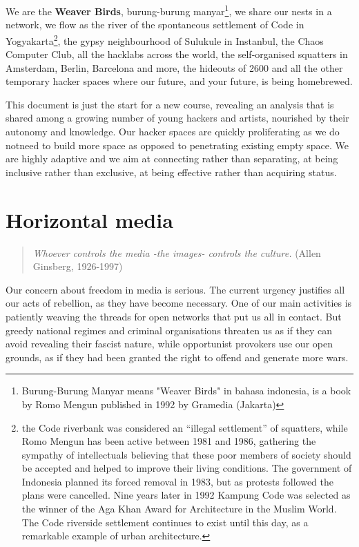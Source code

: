 We are the \textbf{Weaver Birds}, burung-burung manyar\footnote{Burung-Burung
Manyar means "Weaver Birds" in bahasa indonesia, is a book by Romo Mengun
published in 1992 by Gramedia (Jakarta)}, we share our nests in a network, we
f\hbox{}low as the river of the spontaneous settlement of Code in
Yogyakarta\footnote{the Code riverbank was considered an ``illegal settlement''
of squatters, while Romo Mengun has been active between 1981 and 1986, gathering
the sympathy of intellectuals believing that these poor members of society
should be accepted and helped to improve their living conditions. The government
of Indonesia planned its forced removal in 1983, but as protests followed the
plans were cancelled. Nine years later in 1992 Kampung Code was selected as the
winner of the Aga Khan Award for Architecture in the Muslim World. The Code
riverside settlement continues to exist until this day, as a remarkable example
of urban architecture.}, the gypsy neighbourhood of Sulukule in Instanbul, the
Chaos Computer Club, all the hacklabs across the world, the self-organised
squatters in Amsterdam, Berlin, Barcelona and more, the hideouts of 2600 and all
the other temporary hacker spaces where our future, and your future, is being
homebrewed.

This document is just the start for a new course, revealing an analysis that is
shared among a growing number of young hackers and artists, nourished by their
autonomy and knowledge. Our hacker spaces are quickly proliferating as we do
notneed to build more space as opposed to penetrating existing empty space. We
are highly adaptive and we aim at connecting rather than separating, at being
inclusive rather than exclusive, at being ef\hbox{}fective rather than acquiring
status.


\section{Horizontal media}
\label{s:weaver_birds:horizontal_media}

\begin{quote}
\textit{Whoever controls the media -the images- controls the culture.} (Allen
Ginsberg, 1926-1997)
\end{quote}

Our concern about freedom in media is serious. The current urgency
justif\hbox{}ies all our acts of rebellion, as they have become necessary. One
of our main activities is patiently weaving the threads for open networks that
put us all in contact. But greedy national regimes and criminal organisations
threaten us as if they can avoid revealing their fascist nature, while
opportunist provokers use our open grounds, as if they had been granted the
right to of\hbox{}fend and generate more wars.

